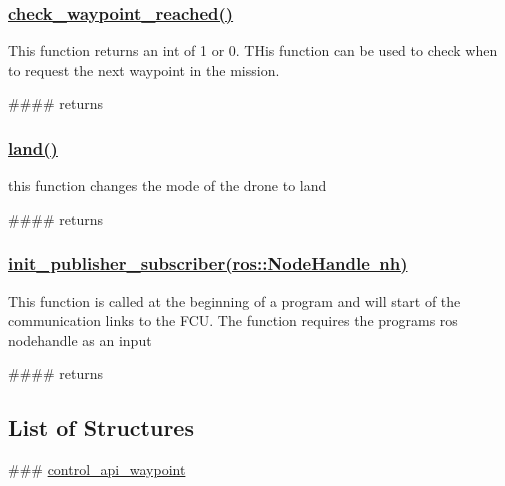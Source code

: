  \subsubsection*{\mbox{\hyperlink{group__control__functions_ga54abc3f6eae022a8710bc0c2e1c54fbe}{check\+\_\+waypoint\+\_\+reached()}}}

This function returns an int of 1 or 0. T\+His function can be used to check when to request the next waypoint in the mission.

\#\#\#\# returns 
\begin{DoxyCode}{0}
\end{DoxyCode}
 \subsubsection*{\mbox{\hyperlink{group__control__functions_ga52a11a139e56315de52d2ab439b0d203}{land()}}}

this function changes the mode of the drone to land

\#\#\#\# returns 
\begin{DoxyCode}{0}
\end{DoxyCode}
 \subsubsection*{\mbox{\hyperlink{group__control__functions_gae693b071b5392f9253cdfc1f4f362fcc}{init\+\_\+publisher\+\_\+subscriber(ros\+::\+Node\+Handle nh)}}}

This function is called at the beginning of a program and will start of the communication links to the F\+CU. The function requires the program\textquotesingle{}s ros nodehandle as an input

\#\#\#\# returns 
\begin{DoxyCode}{0}
\end{DoxyCode}
 \subsection*{List of Structures}

\#\#\# \mbox{\hyperlink{structcontrol__api__waypoint}{control\+\_\+api\+\_\+waypoint}} 
\begin{DoxyCode}{0}
\end{DoxyCode}


